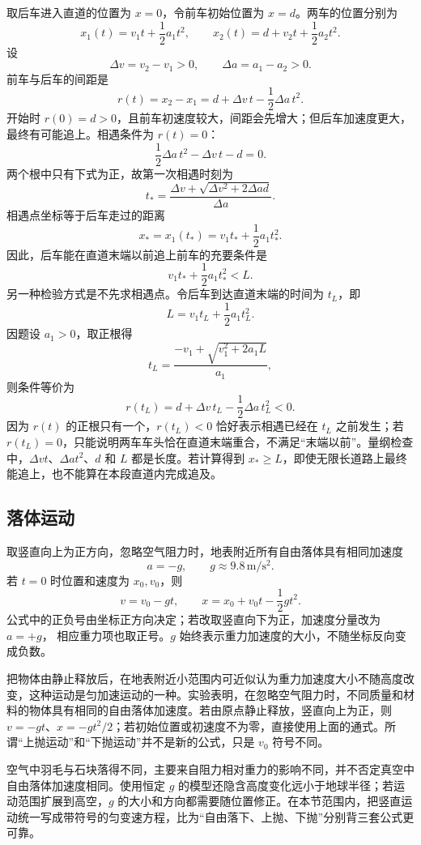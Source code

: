 {\begin{xesolution}
取后车进入直道的位置为 $x=0$，令前车初始位置为 $x=d$。两车的位置分别为
\[
x_1(t)=v_1t+\frac12a_1t^2,
\qquad
x_2(t)=d+v_2t+\frac12a_2t^2.
\]
设
\[
\Delta v=v_2-v_1>0,
\qquad
\Delta a=a_1-a_2>0.
\]
前车与后车的间距是
\[
 r(t)=x_2-x_1=d+\Delta v\,t-\frac12\Delta a\,t^2.
\]
开始时 $r(0)=d>0$，且前车初速度较大，间距会先增大；但后车加速度更大，最终有可能追上。相遇条件为 $r(t)=0$：
\[
\frac12\Delta a\,t^2-\Delta v\,t-d=0.
\]
两个根中只有下式为正，故第一次相遇时刻为
\[
 t_*=\frac{\Delta v+\sqrt{\Delta v^2+2\Delta a d}}{\Delta a}.
\]
相遇点坐标等于后车走过的距离
\[
x_*=x_1(t_*)=v_1t_*+\frac12a_1t_*^2.
\]
因此，后车能在直道末端以前追上前车的充要条件是
\[
  \boxed{v_1t_*+\frac12a_1t_*^2<L}.
\]
另一种检验方式是不先求相遇点。令后车到达直道末端的时间为 $t_L$，即
\[
L=v_1t_L+\frac12a_1t_L^2.
\]
因题设 $a_1>0$，取正根得
\[
t_L=\frac{-v_1+\sqrt{v_1^2+2a_1L}}{a_1},
\]
则条件等价为
\[
\boxed{r(t_L)=d+\Delta v\,t_L-\frac12\Delta a\,t_L^2<0}.
\]
因为 $r(t)$ 的正根只有一个，$r(t_L)<0$ 恰好表示相遇已经在 $t_L$ 之前发生；若 $r(t_L)=0$，只能说明两车车头恰在直道末端重合，不满足“末端以前”。量纲检查中，$\Delta vt$、$\Delta at^2$、$d$ 和 $L$ 都是长度。若计算得到 $x_*\ge L$，即使无限长道路上最终能追上，也不能算在本段直道内完成追及。
\end{xesolution}

\subsection{落体运动}

取竖直向上为正方向，忽略空气阻力时，地表附近所有自由落体具有相同加速度
\begin{equation}
  a=-g,\qquad g\approx9.8\,\mathrm{m/s^2}.
\end{equation}
若 $t=0$ 时位置和速度为 $x_0,v_0$，则
\begin{equation}
  v=v_0-gt,\qquad x=x_0+v_0t-\frac12gt^2.
\end{equation}
公式中的正负号由坐标正方向决定；若改取竖直向下为正，加速度分量改为 $a=+g$，
相应重力项也取正号。$g$ 始终表示重力加速度的大小，不随坐标反向变成负数。

把物体由静止释放后，在地表附近小范围内可近似认为重力加速度大小不随高度改变，这种运动是匀加速运动的一种。实验表明，在忽略空气阻力时，不同质量和材料的物体具有相同的自由落体加速度。若由原点静止释放，竖直向上为正，则 $v=-gt$、$x=-gt^2/2$；若初始位置或初速度不为零，直接使用上面的通式。所谓“上抛运动”和“下抛运动”并不是新的公式，只是 $v_0$ 符号不同。

空气中羽毛与石块落得不同，主要来自阻力相对重力的影响不同，并不否定真空中自由落体加速度相同。使用恒定 $g$ 的模型还隐含高度变化远小于地球半径；若运动范围扩展到高空，$g$ 的大小和方向都需要随位置修正。在本节范围内，把竖直运动统一写成带符号的匀变速方程，比为“自由落下、上抛、下抛”分别背三套公式更可靠。

}
